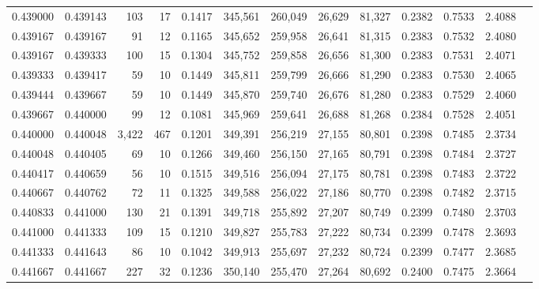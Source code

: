 \begin{tabular}{rrrrrrrrrrrrr}
0.439000 & 0.439143 &   103 &  17 &                                     0.1417 & 345,561 & 260,049 &  26,629 &  81,327 & 0.2382 & 0.7533 & 2.4088 \\
0.439167 & 0.439167 &    91 &  12 &                                     0.1165 & 345,652 & 259,958 &  26,641 &  81,315 & 0.2383 & 0.7532 & 2.4080 \\
0.439167 & 0.439333 &   100 &  15 &                                     0.1304 & 345,752 & 259,858 &  26,656 &  81,300 & 0.2383 & 0.7531 & 2.4071 \\
0.439333 & 0.439417 &    59 &  10 &                                     0.1449 & 345,811 & 259,799 &  26,666 &  81,290 & 0.2383 & 0.7530 & 2.4065 \\
0.439444 & 0.439667 &    59 &  10 &                                     0.1449 & 345,870 & 259,740 &  26,676 &  81,280 & 0.2383 & 0.7529 & 2.4060 \\
0.439667 & 0.440000 &    99 &  12 &                                     0.1081 & 345,969 & 259,641 &  26,688 &  81,268 & 0.2384 & 0.7528 & 2.4051 \\
0.440000 & 0.440048 & 3,422 & 467 &                                     0.1201 & 349,391 & 256,219 &  27,155 &  80,801 & 0.2398 & 0.7485 & 2.3734 \\
0.440048 & 0.440405 &    69 &  10 &                                     0.1266 & 349,460 & 256,150 &  27,165 &  80,791 & 0.2398 & 0.7484 & 2.3727 \\
0.440417 & 0.440659 &    56 &  10 &                                     0.1515 & 349,516 & 256,094 &  27,175 &  80,781 & 0.2398 & 0.7483 & 2.3722 \\
0.440667 & 0.440762 &    72 &  11 &                                     0.1325 & 349,588 & 256,022 &  27,186 &  80,770 & 0.2398 & 0.7482 & 2.3715 \\
0.440833 & 0.441000 &   130 &  21 &                                     0.1391 & 349,718 & 255,892 &  27,207 &  80,749 & 0.2399 & 0.7480 & 2.3703 \\
0.441000 & 0.441333 &   109 &  15 &                                     0.1210 & 349,827 & 255,783 &  27,222 &  80,734 & 0.2399 & 0.7478 & 2.3693 \\
0.441333 & 0.441643 &    86 &  10 &                                     0.1042 & 349,913 & 255,697 &  27,232 &  80,724 & 0.2399 & 0.7477 & 2.3685 \\
0.441667 & 0.441667 &   227 &  32 &                                     0.1236 & 350,140 & 255,470 &  27,264 &  80,692 & 0.2400 & 0.7475 & 2.3664 \\

\end{tabular}
